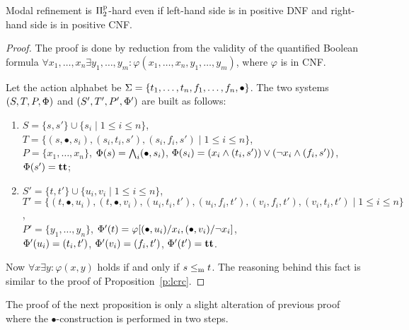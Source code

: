 \begin{proposition}\label{p:ldrc}
Modal refinement is $\mathrm\Pi^\mathrm p_2$-hard even if left-hand side is in positive DNF and
right-hand side is in positive CNF.
\end{proposition}
\begin{proof}
The proof is done by reduction from the validity of the
quantified Boolean formula
 $\forall x_1, \ldots, x_n \exists y_1, \ldots, y_m : 
 \varphi(x_1, \ldots, x_n, y_1, \ldots, y_m)$, where $\varphi$ is in CNF.
% 

 Let the action alphabet be $\mathrm{\Sigma} = \{ t_1, \ldots, t_n, f_1, \ldots, f_n, \bullet \}$.
The two systems $(S,T,P,\mathrm{\Phi})$ and $(S',T',P',\mathrm{\Phi}')$ are built as
follows: 
\begin{enumerate}
    \item $S = \{s,s' \} \cup \{s_i \mid 1 \le i \le n\}$,
$T=\{(s,\bullet,s_i), (s_i, t_i, s'), (s_i, f_i, s') \mid 1 \le i \le n\}$, \\
$P =  \{ x_1, \ldots, x_n\}$,
 $\mathrm{\Phi}(s) = \bigwedge_i (\bullet,s_i)$,
 $\mathrm{\Phi}(s_i) = (x_i \wedge (t_i,s')) \vee (\neg x_i \wedge (f_i,s'))$,
 $\mathrm{\Phi}(s') = \mathbf{tt}$;
%
\item 
$S' = \{t,t' \} \cup \{u_i,v_i \mid 1 \le i \le n \}$,\\
$T' = \{(t,\bullet,u_i), (t,\bullet,v_i), (u_i,t_i,t'), (u_i,f_i,t'),\allowbreak (v_i,f_i,t'), (v_i,t_i,t') \mid 1 \le i \le n\}$,\\
$P' = \{y_1, \ldots, y_n \}$,
$\mathrm{\Phi}'(t) = \varphi[(\bullet,u_i)/x_i,(\bullet,v_i)/\neg x_i]$,\\
 $\mathrm{\Phi}'(u_i) = (t_i,t')$, $\mathrm{\Phi}'(v_i) = (f_i,t')$, $\mathrm{\Phi}'(t') = \mathbf{tt}$.
\end{enumerate}

 Now $\forall x \exists y : \varphi(x,y)$ holds if
 and only if $s \le_\mathrm m t$.
 The reasoning behind this fact is similar to the proof of
 Proposition~\ref{p:lcrc}.

\end{proof}

The proof of the next proposition is only a slight alteration of previous proof where the $\bullet$-construction is performed in two steps.

